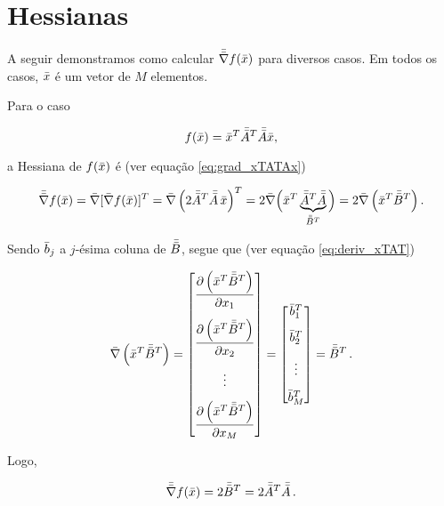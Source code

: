 \section{Hessianas}

A seguir demonstramos como calcular $\bar{\bar{\nabla}}f(\bar{x})$
para diversos casos.
Em todos os casos, $\bar{x}$ é um vetor de $M$ elementos.

\begin{example}
    Para o caso

    \begin{equation}
    f(\bar{x}) = \bar{x}^T\bar{\bar{A}}^T\bar{\bar{A}}\bar{x},
    \end{equation}
    
    \noindent a Hessiana de $f(\bar{x})$ é (ver equação \ref{eq:grad_xTATAx})
    
    \begin{equation}
        \bar{\bar{\nabla}}f(\bar{x}) =
        \bar{\nabla}[\bar{\nabla}f(\bar{x})]^T =
        \bar{\nabla}\left(2\bar{\bar{A}}^T\bar{\bar{A}}\thinspace\bar{x}\right)^T =
        2\bar{\nabla}\Big(\bar{x}^T\underbrace{\bar{\bar{A}}^T\bar{\bar{A}}}_{\bar{\bar{B}}^T}\Big) =
        2\bar{\nabla}\left(\bar{x}^T\bar{\bar{B}}^T\right).
    \end{equation}

    \noindent Sendo $\bar{b}_j$ a $j$-ésima coluna de $\bar{\bar{B}}$, segue que
    (ver equação \ref{eq:deriv_xTAT})
        
    \begin{equation}
        \vect{\nabla}\left(\vect{x}^T\mat{B}^T\right) = 
        \begin{bmatrix}
        \dfrac{\partial \left(\vect{x}^T\mat{B}^T\right)}{\partial x_1} \vspace{0.3cm}\\
        \dfrac{\partial \left(\vect{x}^T\mat{B}^T\right)}{\partial x_2} \vspace{0.3cm}\\
        \vdots \vspace{0.3cm}\\
        \dfrac{\partial \left(\vect{x}^T\mat{B}^T\right)}{\partial x_M}
        \end{bmatrix}
        =
        \begin{bmatrix}
        \vect{b}_1^T \vspace{0.3cm}\\
        \vect{b}_2^T \vspace{0.3cm}\\
        \vdots \vspace{0.3cm}\\
        \vect{b}_M^T
        \end{bmatrix}
        =
        \mat{B}^T
        \thinspace .
    \end{equation}

    \noindent Logo,
    
    \begin{equation}
        \bar{\bar{\nabla}}f(\bar{x}) =
        2\bar{\bar{B}}^T = 2\bar{\bar{A}}^T\bar{\bar{A}}
        \thinspace .
    \end{equation}
\end{example}

